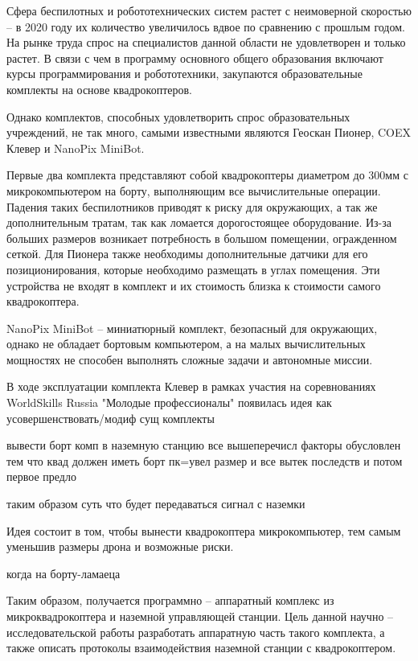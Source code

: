 Сфера беспилотных и робототехнических систем растет с неимоверной скоростью -- в 2020 году их количество увеличилось вдвое по сравнению с прошлым годом. На рынке труда спрос на специалистов данной области не удовлетворен и только растет. В связи с чем в программу основного общего образования включают курсы программирования и робототехники, закупаются образовательные комплекты на основе квадрокоптеров. \cite{minobr}

Однако комплектов, способных удовлетворить спрос образовательных учреждений, не так много, самыми известными являются Геоскан Пионер, COEX Клевер и NanoPix MiniBot.

Первые два комплекта представляют собой квадрокоптеры диаметром до 300мм с микрокомпьютером на борту, выполняющим все вычислительные операции. Падения таких беспилотников приводят к риску для окружающих, а так же дополнительным тратам, так как ломается дорогостоящее оборудование. Из-за больших размеров возникает потребность в большом помещении, огражденном сеткой. Для Пионера также необходимы дополнительные датчики для его позиционирования, которые необходимо размещать в углах помещения. Эти устройства не входят в комплект и их стоимость близка к стоимости самого квадрокоптера.

NanoPix MiniBot -- миниатюрный комплект, безопасный для окружающих, однако не обладает бортовым компьютером, а на малых вычислительных мощностях не способен выполнять сложные задачи и автономные миссии.

В ходе эксплуатации комплекта Клевер в рамках участия на соревнованиях WorldSkills Russia "Молодые профессионалы" появилась идея как усовершенствовать/модиф сущ комплекты
 
 вывести борт комп в наземную станцию
 все вышеперечисл факторы обусловлен тем что квад должен иметь  борт пк=увел размер и все вытек последств
 и потом первое предло
 
 таким образом суть что будет передаваться сигнал с наземки
 
Идея состоит в том, чтобы вынести квадрокоптера микрокомпьютер, тем самым уменьшив размеры дрона и возможные риски.

когда на борту-ламаеца

Таким образом, получается программно -- аппаратный комплекс из микроквадрокоптера и наземной управляющей станции.
Цель данной научно -- исследовательской работы разработать аппаратную часть такого комплекта, а также описать протоколы взаимодействия наземной станции с квадрокоптером.
